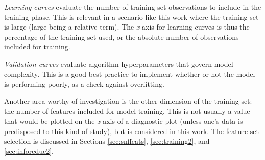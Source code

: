 \textit{Learning curves} evaluate the number of training set observations to
include in the training phase. This is relevant in a scenario like this work
where the training set is large (large being a relative term).  The
\textit{x}-axis for learning curves is thus the percentage of the training set
used, or the absolute number of observations included for training. 

\textit{Validation curves} evaluate algorithm hyperparameters that govern model
complexity. This is a good best-practice to implement whether or not the model 
is performing poorly, as a check against overfitting. 

Another area worthy of investigation is the other dimension of the training
set: the number of features included for model training. This is not usually a
value that would be plotted on the \textit{x}-axis of a diagnostic plot (unless
one's data is predisposed to this kind of study), but is considered in this
work. The feature set selection is discussed in Sections \ref{sec:snffeats},
\ref{sec:training2}, and \ref{sec:inforeduc2}.

